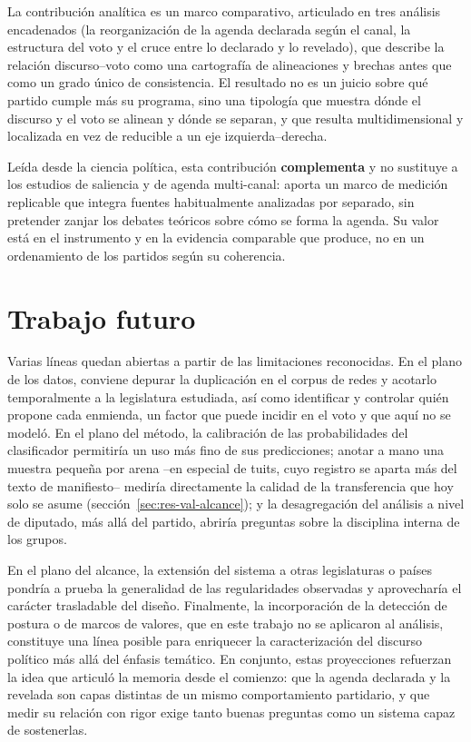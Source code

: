 La contribución analítica es un marco comparativo, articulado en tres análisis
encadenados (la reorganización de la agenda declarada según el canal, la
estructura del voto y el cruce entre lo declarado y lo revelado), que describe la
relación discurso--voto como una cartografía de alineaciones y brechas antes que
como un grado único de consistencia. El resultado no es un juicio sobre qué
partido cumple más su programa, sino una tipología que muestra dónde el discurso
y el voto se alinean y dónde se separan, y que resulta multidimensional y
localizada en vez de reducible a un eje izquierda--derecha.

Leída desde la ciencia política, esta contribución \textbf{complementa} y no
sustituye a los estudios de saliencia y de agenda multi-canal: aporta un marco de
medición replicable que integra fuentes habitualmente analizadas por separado, sin
pretender zanjar los debates teóricos sobre cómo se forma la agenda. Su valor está
en el instrumento y en la evidencia comparable que produce, no en un ordenamiento
de los partidos según su coherencia.

\section{Trabajo futuro}
\label{sec:concl-futuro}

Varias líneas quedan abiertas a partir de las limitaciones reconocidas. En el
plano de los datos, conviene depurar la duplicación en el corpus de redes y
acotarlo temporalmente a la legislatura estudiada, así como identificar y
controlar quién propone cada enmienda, un factor que puede incidir en el voto y
que aquí no se modeló. En el plano del método, la calibración de las
probabilidades del clasificador permitiría un uso más fino de sus predicciones;
anotar a mano una muestra pequeña por arena --en especial de tuits, cuyo registro
se aparta más del texto de manifiesto-- mediría directamente la calidad de la
transferencia que hoy solo se asume (sección~\ref{sec:res-val-alcance}); y la
desagregación del análisis a nivel de diputado, más allá del partido, abriría
preguntas sobre la disciplina interna de los grupos.

En el plano del alcance, la extensión del sistema a otras legislaturas o países
pondría a prueba la generalidad de las regularidades observadas y aprovecharía el
carácter trasladable del diseño. Finalmente, la incorporación de la detección de
postura o de marcos de valores, que en este trabajo no se aplicaron al análisis,
constituye una línea posible para enriquecer la caracterización del discurso
político más allá del énfasis temático. En conjunto, estas proyecciones refuerzan
la idea que articuló la memoria desde el comienzo: que la agenda declarada y la
revelada son capas distintas de un mismo comportamiento partidario, y que medir
su relación con rigor exige tanto buenas preguntas como un sistema capaz de
sostenerlas.
